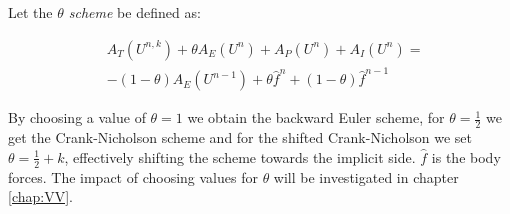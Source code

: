 Let the \textit{$\theta$ scheme} be defined as: 

\begin{align}
& A_T(U^{n,k}) + \theta A_E(U^{n}) + A_P(U^{n}) + A_I(U^{n}) = \\
& - (1-\theta) A_E(U^{n-1}) + \theta \hat{f}^n + (1-\theta) \hat{f}^{n-1}  
\end{align}

By choosing a value of $ \theta = 1$ we obtain the backward Euler scheme, for $ \theta = \frac{1}{2}$ we get the Crank-Nicholson scheme and for the shifted Crank-Nicholson we set $ \theta = \frac{1}{2} + k$, effectively shifting the scheme towards the implicit side. $\hat{f}$ is the body forces. The impact of choosing values for $\theta$ will be investigated in chapter \ref{chap:VV}.





